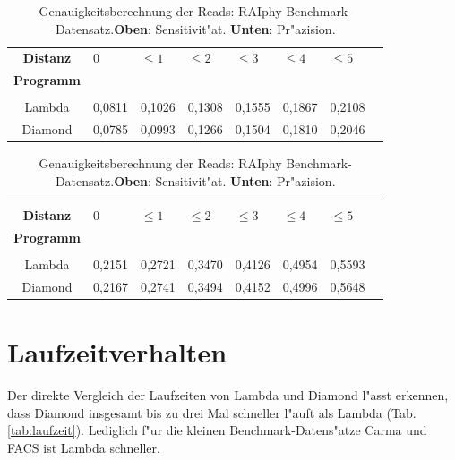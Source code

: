 \documentclass[10pt, a4paper]{report}[08.12.2015]
\begin{document}
      \begin{table}[H]
        \begin{tabular}{clllllll}
          \textbf{Distanz}&0&$\leq1$&$\leq2$&$\leq3$&$\leq4$&$\leq5$\\
          \textbf{Programm}&&&&&\\ \hline  
          &&&&&&\\
          Lambda&0,0811&0,1026&0,1308&0,1555&0,1867&0,2108\\
          Diamond&0,0785&0,0993&0,1266&0,1504&0,1810&0,2046\\
        \end{tabular}

        \begin{tabular}{clllllll}
        &&&&&&\\
          \textbf{Distanz}&0&$\leq1$&$\leq2$&$\leq3$&$\leq4$&$\leq5$\\
          \textbf{Programm}&&&&&\\ \hline  
          &&&&&&\\
          Lambda&0,2151&0,2721&0,3470&0,4126&0,4954&0,5593\\
          Diamond&0,2167&0,2741&0,3494&0,4152&0,4996&0,5648\\
        \end{tabular}
        \caption[Genauigkeitsberechnung der Reads: RAIphy Benchmark-Datensatz.]{\small{Genauigkeitsberechnung der Reads: RAIphy Benchmark-Datensatz.\newline \textbf{Oben}: Sensitivit"at. \textbf{Unten}: Pr"azision.} }
        \label{tab:raiphy}
      \end{table}
      \newpage
         
    \section{Laufzeitverhalten}
	Der direkte Vergleich der Laufzeiten von Lambda und Diamond l"asst 				erkennen, dass Diamond insgesamt bis zu drei Mal schneller l"auft als
	Lambda (Tab. \ref{tab:laufzeit}). Lediglich f"ur die kleinen Benchmark-Datens"atze Carma und
	FACS ist Lambda schneller.\newline   
  
\end{document}
